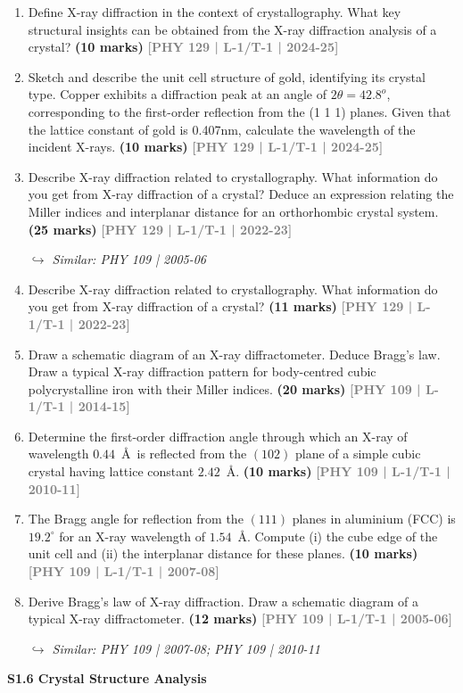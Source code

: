 \documentclass[12pt,a3paper]{article}
\newcommand{\yr}[1]{\hfill\textcolor{gray}{\small\textbf{[#1]}}}
\newcommand{\mk}[1]{\textcolor{orange!70!black}{\small\textbf{(#1 marks)}}}
\newcommand{\variant}[1]{\par\vspace{1pt}\textcolor{blue!50!black}%
  {\footnotesize\textit{$\hookrightarrow$ Similar: #1}}}
\newcommand{\subtopic}[2]{%
  \vspace{10pt}
  \noindent\begin{tcolorbox}[colback=#1!8,colframe=#1,boxrule=0.6pt,arc=4pt,
    left=6pt,right=6pt,top=4pt,bottom=4pt]
    \small\bfseries\textcolor{#1}{#2}
  \end{tcolorbox}
  \vspace{2pt}
}
\begin{document}
\begin{enumerate}

\item Define X-ray diffraction in the context of crystallography. What key structural
insights can be obtained from the X-ray diffraction analysis of a crystal?
\mk{10} \yr{PHY 129 | L-1/T-1 | 2024-25}

\item Sketch and describe the unit cell structure of gold, identifying its crystal type. Copper exhibits a diffraction peak at an angle of $2\theta= 42.8^o$, corresponding to the first-order reflection from the (1 1 1) planes. Given that the lattice constant of gold is 0.407nm, calculate the wavelength of the incident X-rays.
\mk{10} \yr{PHY 129 | L-1/T-1 | 2024-25}



\item Describe X-ray diffraction related to crystallography. What information do you get from X-ray diffraction of a crystal? Deduce an expression relating the Miller indices and interplanar distance for an orthorhombic crystal system.
\mk{25} \yr{PHY 129 | L-1/T-1 | 2022-23}
\variant{PHY 109 | 2005-06}

\item Describe X-ray diffraction related to crystallography. What information do you get from X-ray diffraction of a crystal?
\mk{11} \yr{PHY 129 | L-1/T-1 | 2022-23}

\item Draw a schematic diagram of an X-ray diffractometer. Deduce Bragg's law. Draw a typical X-ray diffraction pattern for body-centred cubic polycrystalline iron with their Miller indices.
\mk{20} \yr{PHY 109 | L-1/T-1 | 2014-15}

\item Determine the first-order diffraction angle through which an X-ray of wavelength $0.44$~\AA\ is reflected from the $(102)$ plane of a simple cubic crystal having lattice constant $2.42$~\AA.
\mk{10} \yr{PHY 109 | L-1/T-1 | 2010-11}

\item The Bragg angle for reflection from the $(111)$ planes in aluminium (FCC) is $19.2^\circ$ for an X-ray wavelength of $1.54$~\AA. Compute (i) the cube edge of the unit cell and (ii) the interplanar distance for these planes.
\mk{10} \yr{PHY 109 | L-1/T-1 | 2007-08}

\item Derive Bragg's law of X-ray diffraction. Draw a schematic diagram of a typical X-ray diffractometer.
\mk{12} \yr{PHY 109 | L-1/T-1 | 2005-06}
\variant{PHY 109 | 2007-08; PHY 109 | 2010-11}

\end{enumerate}
\label{sec:s16}
\subtopic{cA}{S1.6 \quad Crystal Structure Analysis}
\end{document}

